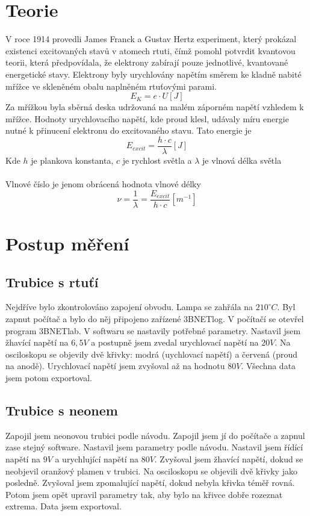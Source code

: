 \documentclass{article}
\begin{document}
\section{Teorie}
V roce 1914 provedli James Franck a Gustav Hertz experiment, který prokázal existenci excitovaných stavů v atomech rtuti, čímž pomohl potvrdit kvantovou teorii, která předpovídala, že elektrony zabírají pouze jednotlivé, kvantované energetické stavy. Elektrony byly urychlovány napětím směrem ke kladně nabité mřížce ve skleněném obalu naplněném rtuťovými parami.\\
\begin{equation}
  E_{K} = e \cdot U [J]
\end{equation}
Za mřížkou byla sběrná deska udržovaná na malém záporném napětí vzhledem k mřížce. Hodnoty urychlovacího napětí, kde proud klesl, udávaly míru energie nutné k přinucení elektronu do excitovaného stavu. Tato energie je
\begin{equation}
  E_{excit} = \frac{h \cdot c}{\lambda} [J]
\end{equation}
Kde $h$ je plankova konstanta, $c$ je rychlost světla a $\lambda$ je vlnová délka světla\\\\
Vlnové číslo je jenom obrácená hodnota vlnové délky
\begin{equation}
  \nu = \frac{1}{\lambda} = \frac{E_{excit}}{h \cdot c} [m^{-1}]
\end{equation}
\section{Postup měření}
\subsection{Trubice s rtuťí}
Nejdříve bylo zkontrolováno zapojení obvodu.
Lampa se zahřála na $210 ^{\circ} C$. Byl zapnut počítač a bylo do něj připojeno zařízené 3BNETlog.
V počítačí se otevřel program 3BNETlab. V softwaru se nastavily potřebné parametry.
Nastavil jsem žhavící napětí na $6,5 V$ a postupně jsem zvedal urychlovací napětí na $20V$.
Na osciloskopu se objevily dvě křivky: modrá (uychlovací napětí) a červená (proud na anodě).
Urychlovací napětí jsem zvyšoval až na hodnotu $80V$.
Všechna data jsem potom exportoval.
\subsection{Trubice s neonem}
Zapojil jsem neonovou trubici podle návodu.
Zapojil jsem jí do počítače a zapnul zase stejný software.
Nastavil jsem parametry podle návodu.
Nastavil jsem řídící napětí na $9V$ a urychlující napětí na $80V$.
Zvyšoval jsem žhavící napětí, dokud se neobjevil oranžový plamen v trubici.
Na osciloskopu se objevili dvě křivky jako posledně.
Zvyšoval jsem zpomalující napětí, dokud nebyla křivka téměř rovná.
Potom jsem opět upravil parametry tak, aby bylo na křivce dobře rozeznat extrema.
Data jsem exportoval.
\end{document}
